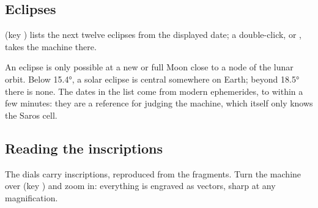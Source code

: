 \subsection{Eclipses}

 (key ) lists the next twelve eclipses from the
displayed date; a double-click, or , takes the machine there.


\begin{info}
An eclipse is only possible at a new or full Moon close to a node of the lunar orbit. Below
15.4°, a solar eclipse is central somewhere on Earth; beyond 18.5° there is none. The dates in
the list come from modern ephemerides, to within a few minutes: they are a reference for
judging the machine, which itself only knows the Saros cell.
\end{info}

\subsection{Reading the inscriptions}

The dials carry inscriptions, reproduced from the fragments. Turn the machine over (key
) and zoom in: everything is engraved as vectors, sharp at any magnification.


